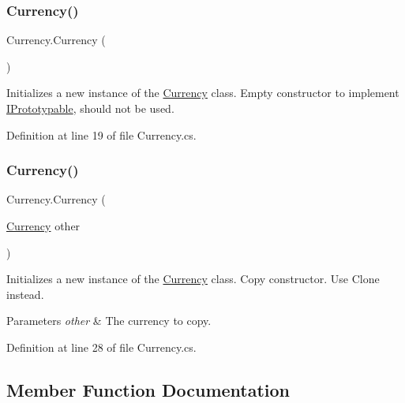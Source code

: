 \subsubsection{\texorpdfstring{Currency()}{Currency()}\hspace{0.1cm}{\footnotesize\ttfamily [1/2]}}
{\footnotesize\ttfamily Currency.\+Currency (\begin{DoxyParamCaption}{ }\end{DoxyParamCaption})}



Initializes a new instance of the \hyperlink{class_currency}{Currency} class. Empty constructor to implement \hyperlink{interface_i_prototypable}{I\+Prototypable}, should not be used. 



Definition at line 19 of file Currency.\+cs.

\mbox{\label{class_currency_ace384f1ac7187d836be9829284b75dbe}} 
\subsubsection{\texorpdfstring{Currency()}{Currency()}\hspace{0.1cm}{\footnotesize\ttfamily [2/2]}}
{\footnotesize\ttfamily Currency.\+Currency (\begin{DoxyParamCaption}\item[{\hyperlink{class_currency}{Currency}}]{other }\end{DoxyParamCaption})}



Initializes a new instance of the \hyperlink{class_currency}{Currency} class. Copy constructor. Use Clone instead. 


\begin{DoxyParams}{Parameters}
{\em other} & The currency to copy.\\
\hline
\end{DoxyParams}


Definition at line 28 of file Currency.\+cs.



\subsection{Member Function Documentation}
\mbox{\label{class_currency_addd39e17adc2603bf12c600e23db9884}} 

